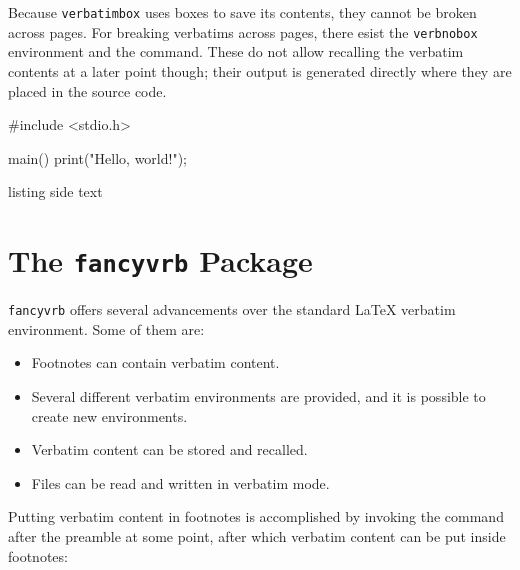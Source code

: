 \documentclass[article,a4paper,oneside,10pt]{memoir}
\newcommand\code[1]{\texttt{#1}}
\begin{document}
Because  \code{verbatimbox}  uses boxes  to  save  its contents,  they  cannot
be  broken across  pages. For  breaking verbatims  across  pages, there  esist
the  \code{verbnobox}  environment and  the  \texttt{\verbfilenobox}
command. These do not  allow recalling the verbatim contents at  a later point
though; their output is generated directly where they are placed in the source
code.


\begin{tcblisting}{}
\begin{verbnobox}
#include <stdio.h>

main() {
    print("Hello, world!\n");
}
\end{verbnobox}
\end{tcblisting}

\begin{tcblisting}{listing side text}
\end{tcblisting}

% ========================================================================== %
\newpage
\chapter{The \code{fancyvrb} Package \cite{fancyvrb}}
\label{chap:fancyvrb}

\code{fancyvrb}  offers  several  advancements   over  the  standard  \LaTeX{}
verbatim environment. Some of them are:

\begin{itemize}\firmlist
    \item
        Footnotes can contain verbatim content.
    \item
        Several  different  verbatim  environments  are provided,  and  it  is
        possible to create new environments.
    \item
        Verbatim content can be stored and recalled.
    \item
        Files can be read and written in verbatim mode.
\end{itemize}

Putting  verbatim  content  in  footnotes  is  accomplished  by  invoking  the
\texttt{\VerbatimFootnotes}  command  after  the  preamble  at  some
point, after which verbatim content can be put inside footnotes:
\end{document}
